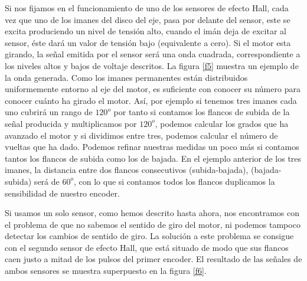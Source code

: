 \documentclass[10pt,a4paper]{report}
\begin{document}
Si nos fijamos en el funcionamiento de uno de los sensores de efecto Hall, cada vez que uno de los imanes del disco del eje, pasa por delante del sensor, este se excita produciendo un nivel de tensión alto, cuando el imán deja de excitar al sensor, éste dará un valor de tensión bajo (equivalente a cero). Si el motor esta girando, la señal emitida por el sensor será una onda cuadrada, correspondiente a los niveles altos y bajos de voltaje descritos. La figura \ref{f5} muestra un ejemplo de la onda generada. Como los imanes permanentes están distribuidos uniformemente entorno al eje del motor, es suficiente con conocer su número para conocer cuánto ha girado el motor. Así, por ejemplo si tenemos tres imanes cada uno cubrirá un rango de $120^o$ por tanto si contamos los flancos de subida de la señal producida y multiplicamos por $120^o$, podemos calcular los grados que ha avanzado el motor y si dividimos entre tres, podemos calcular el número de vueltas que ha dado. Podemos refinar nuestras medidas un poco  más si contamos tantos los flancos de subida como los de bajada. En el ejemplo anterior de los tres imanes, la distancia entre dos flancos consecutivos (subida-bajada), (bajada-subida) será de $60^o$, con lo que si contamos todos los flancos duplicamos la sensibilidad de nuestro encoder.

Si usamos un solo sensor, como hemos descrito hasta ahora, nos encontramos con el problema de que no sabemos el sentido de giro del motor, ni podemos tampoco detectar los cambios de sentido de giro.
La solución a este problema se consigue con el segundo sensor de efecto Hall, que está situado de modo que sus flancos caen justo a mitad de los pulsos del primer encoder. El resultado de las señales de  ambos sensores  se muestra superpuesto en la figura \ref{f6}. 
\end{document}
